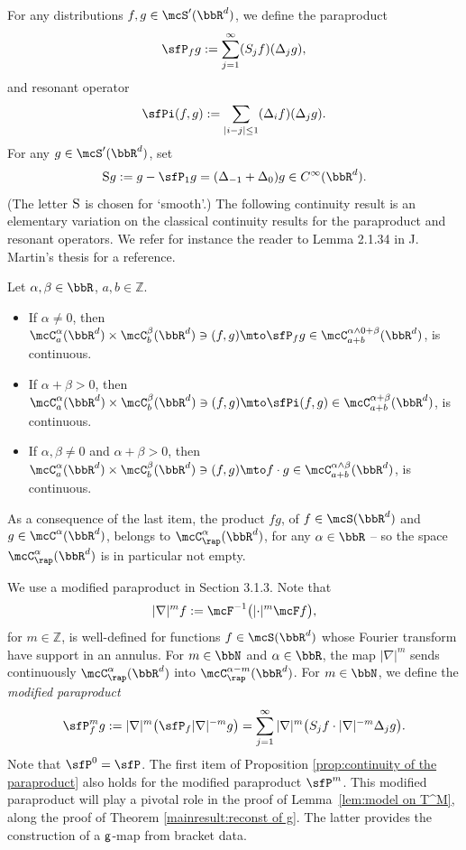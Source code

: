 For any distributions $f,g\in\mcS'(\bbR^d)$, we define the paraproduct\vspace*{-3pt}
\[
\sfP_fg:=\sum_{j=1}^\infty (S_jf) (\Delta_jg),
\]
and resonant operator\vspace*{-3pt}
\[
\sfPi(f,g):=\sum_{|i-j|\le1}(\Delta_if)(\Delta_jg).
\]
For any $g\in\mcS'(\bbR^d)$, set
\begin{equation} \label{EqDefnSmoothS}
\textsc{S} g := g - \sfP_1g = (\Delta_{-1} + \Delta_0)g \in C^\infty(\bbR^d).
\end{equation}
(The letter $\textsc{S}$ is chosen for `smooth'.) The following continuity result is an elementary variation on the classical continuity results for the paraproduct and resonant operators. We refer for instance the reader to Lemma 2.1.34 in J. Martin's thesis \cite{MartinThesis} for a reference.

\begin{prop}\label{prop:continuity of the paraproduct}
Let $\alpha,\beta\in\bbR$, $a,b\in\mathbb{Z}$.
\begin{itemize}
\item If $\alpha\neq0$, then $\mcC_a^\alpha(\bbR^d)\times \mcC_b^\beta(\bbR^d)\ni(f,g)\mto\sfP_fg\in \mcC_{a+b}^{\alpha\wedge0+\beta}(\bbR^d)$, is continuous.
\item If $\alpha+\beta>0$, then $\mcC_a^\alpha(\bbR^d)\times \mcC_b^\beta(\bbR^d)\ni(f,g)\mto\sfPi(f,g)\in \mcC_{a+b}^{\alpha+\beta}(\bbR^d)$, is continuous.
\item If $\alpha,\beta\neq0$ and $\alpha+\beta>0$, then $\mcC_a^\alpha(\bbR^d)\times \mcC_b^\beta(\bbR^d)\ni(f,g)\mto f\cdot g\in \mcC_{a+b}^{\alpha\wedge\beta}(\bbR^d)$, is continuous.
\end{itemize}
\end{prop}

As a consequence of the last item, the product $fg$, of $f\in\mcS(\bbR^d)$ and $g\in \mcC^\alpha(\bbR^d)$, belongs to $\mcC_\rap^\alpha(\bbR^d)$, for any $\alpha\in\bbR$ -- so the space $\mcC_\rap^\alpha(\bbR^d)$ is in particular not empty.

We use a modified paraproduct in Section 3.1.3. Note that
\[
|\nabla|^m f:=\mcF^{-1}\bigl(|{\cdot}|^m\mcF f\bigr),
\]
for $m\in\mathbb{Z}$, is well-defined for functions $f\in\mcS(\bbR^d)$ whose Fourier transform have support in an annulus. For $m\in\bbN$ and $\alpha\in\bbR$, the map $|\nabla|^m$ sends continuously $\mcC_\rap^\alpha(\bbR^d)$ into $\mcC_\rap^{\alpha-m}(\bbR^d)$. For $m\in\bbN$, we define the \emph{{modified paraproduct}}\vspace*{-3pt}
\[
\sfP_f^m g := |\nabla|^m\bigl(\sfP_f|\nabla|^{-m}g\bigr) = \sum_{j=1}^\infty|\nabla|^m\bigl(S_jf\cdot|\nabla|^{-m}\Delta_jg\bigr).
\]
Note that $\sfP^0=\sfP$. The first item of Proposition \ref{prop:continuity of the paraproduct} also holds for the modified paraproduct $\sfP^m$. This modified paraproduct will play a pivotal role in the proof of Lemma~\ref{lem:model on T^M}, along the proof of Theorem \ref{mainresult:reconst of g}. The latter provides the construction of a $\sf g$-map from bracket data.

